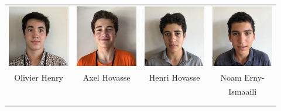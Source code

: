 \begin{center}
\begin{tabular}{cccc}
\includegraphics[angle=270,origin=c, width=27mm]{eleves/Henry Olivier.JPG} &
\includegraphics[angle=270,origin=c, width=27mm]{eleves/Hovasse Axel.JPG} &
\includegraphics[angle=270,origin=c, width=27mm]{eleves/Hovasse Henri.JPG} &
\includegraphics[angle=270,origin=c, width=27mm]{eleves/Ismaaili Erny Noam.JPG} \\
Olivier Henry & Axel Hovasse & Henri Hovasse & Noam Erny-\\ & & & Ismaaili \\ \\ \\


\end{tabular}
\end{center}

